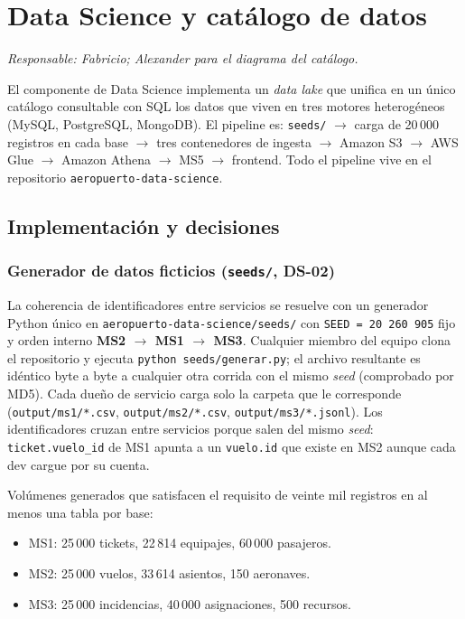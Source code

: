 \section{Data Science y catálogo de datos}
\label{sec:data-science}
\textit{Responsable: Fabricio; Alexander para el diagrama del catálogo.}

El componente de Data Science implementa un \emph{data lake} que unifica
en un único catálogo consultable con SQL los datos que viven en tres
motores heterogéneos (MySQL, PostgreSQL, MongoDB). El pipeline es:
\texttt{seeds/} $\to$ carga de 20\,000 registros en cada base $\to$
tres contenedores de ingesta $\to$ Amazon S3 $\to$ AWS Glue $\to$
Amazon Athena $\to$ MS5 $\to$ frontend. Todo el pipeline vive en el
repositorio \texttt{aeropuerto-data-science}.

\subsection{Implementación y decisiones}

\subsubsection{Generador de datos ficticios (\texttt{seeds/}, DS-02)}
La coherencia de identificadores entre servicios se resuelve con un
generador Python único en \texttt{aeropuerto-data-science/seeds/} con
\texttt{SEED = 20\,260\,905} fijo y orden interno
\textbf{MS2 $\to$ MS1 $\to$ MS3}. Cualquier miembro del equipo clona el
repositorio y ejecuta \texttt{python seeds/generar.py}; el archivo
resultante es idéntico byte a byte a cualquier otra corrida con el
mismo \emph{seed} (comprobado por MD5). Cada dueño de servicio carga
solo la carpeta que le corresponde
(\texttt{output/ms1/*.csv}, \texttt{output/ms2/*.csv},
\texttt{output/ms3/*.jsonl}). Los identificadores cruzan entre
servicios porque salen del mismo \emph{seed}: \texttt{ticket.vuelo\_id}
de MS1 apunta a un \texttt{vuelo.id} que existe en MS2 aunque cada dev
cargue por su cuenta.

Volúmenes generados que satisfacen el requisito de veinte mil registros
en al menos una tabla por base:

\begin{itemize}
  \item MS1: 25\,000 tickets, 22\,814 equipajes, 60\,000 pasajeros.
  \item MS2: 25\,000 vuelos, 33\,614 asientos, 150 aeronaves.
  \item MS3: 25\,000 incidencias, 40\,000 asignaciones, 500 recursos.
\end{itemize}


